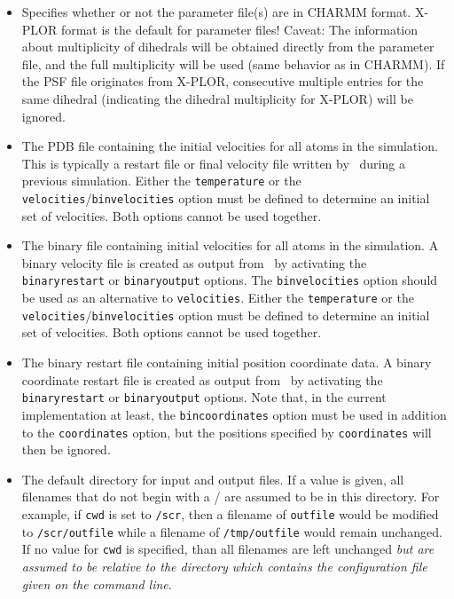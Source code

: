 \begin{itemize}
\item
{}
{Specifies whether or not the parameter file(s) are in CHARMM format.
 X-PLOR format is the default for parameter files!
 Caveat: The information about multiplicity of dihedrals will be
 obtained directly from the parameter file, and the full multiplicity
 will be used (same behavior as in CHARMM). If the PSF file originates
 from X-PLOR, consecutive multiple entries for the same dihedral 
 (indicating the dihedral multiplicity for X-PLOR) will be ignored.}

\item
{}
{\label{param:velocities}
The PDB file containing the initial velocities for all 
atoms in the simulation.  
This is typically a restart file or final velocity file written 
by \NAMD\ during a previous simulation.  
Either the {\tt temperature} 
or the {\tt velocities}/{\tt binvelocities} 
option must be defined to determine an initial set of velocities.  
Both options cannot be used together.}

\item
{}
{\label{param:binvelocities}
The binary file containing initial velocities for all 
atoms in the simulation.  
A binary velocity file is created as output from \NAMD\ 
by activating the {\tt binaryrestart} or {\tt binaryoutput} options.  
The {\tt binvelocities} option should be used as 
an alternative to {\tt velocities}.  
Either the {\tt temperature} 
or the {\tt velocities}/{\tt binvelocities} 
option must be defined to determine an initial set of velocities.  
Both options cannot be used together.  
}

\item
{}
{
The binary restart file containing initial position 
coordinate data.  
A binary coordinate restart file is created as output from \NAMD\ 
by activating the {\tt binaryrestart} or {\tt binaryoutput} options.  
Note that, in the current implementation at least, 
the {\tt bincoordinates} option must be used in addition 
to the {\tt coordinates} option, 
but the positions specified by {\tt coordinates} will then be ignored.  
}

\item
{}
{The default directory for input and output files.  
If a value is given, all filenames that 
do not begin with a / are assumed to be in this directory.  
For example, if {\tt cwd} is set to {\tt /scr}, then a
filename of {\tt outfile} would be modified to {\tt /scr/outfile}
while a filename of {\tt /tmp/outfile} would remain unchanged.
If no value for {\tt cwd} is specified, than all filenames are 
left unchanged {\em but are assumed to be relative to the directory
which contains the configuration file given on the command line}.}

\end{itemize}

